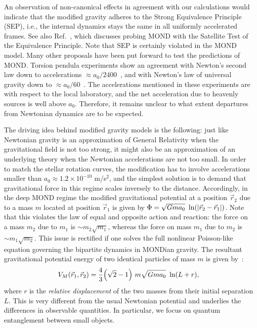 \documentclass[aps,prd,reprint,superscriptaddress,nofootinbib,floatfix]{revtex4-2}
\begin{document}
An observation of non-canonical effects in agreement with our calculations would indicate that the modified gravity adheres to the Strong Equivalence Principle (SEP), i.e., the internal dynamics stays the same in all uniformly accelerated frames.
See also Ref.~\cite{MOND-SEPwSTEP-Pereira2016}, which discusses probing MOND with the Satellite Test of the Equivalence Principle. Note that SEP is certainly violated in the MOND model.
Many other proposals have been put forward to test the predictions of MOND. Torsion pendula experiments show an agreement with Newton's second law down to accelerations $\approx a_0/2400$~\cite{NewtonLaw-TorsionPend-Gundlach2007}, and with Newton's law of universal gravity down to $\approx a_0/60$~\cite{TestNewton-Little2014}.
The accelerations mentioned in these experiments are with respect to the local laboratory, and the net acceleration due to heavenly sources is well above $a_0$. Therefore, it remains unclear to what extent departures from Newtonian dynamics are to be expected.


The driving idea behind modified gravity models is the following: just like Newtonian gravity is an approximation of General Relativity when the gravitational field is not too strong, it might also be an approximation of an underlying theory when the Newtonian accelerations are not too small.
In order to match the stellar rotation curves, the modification has to involve accelerations smaller than $a_0 \approx 1.2 \times 10^{-10}$ m/s$^2$, and the simplest solution is to demand that gravitational force in this regime scales inversely to the distance.
Accordingly, in the deep MOND regime the modified gravitational potential at a position $\vec r_2$ due to a mass $m$ located at position $\vec r_1$ is given by $\Phi = \sqrt{Gma_0} \ \ln( \abs{\vec r_2 - \vec r_1})$. 
Note that this violates the law of equal and opposite action and reaction: the force on a mass $m_2$ due to $m_1$ is $\sim m_2\sqrt{m_1}$, whereas the force on mass $m_1$ due to $m_2$ is $\sim m_1\sqrt{m_2}$.
This issue is rectified if one solves the full nonlinear Poisson-like equation governing the bipartite dynamics in MONDian gravity.
The resultant gravitational potential energy of two identical particles of mass $m$ is given by~\cite{MOND2Body-Milgrom2014,MOND2Body-Zhao2010,MOND2Body-Milgrom1986}:
\begin{equation}
V_M(\vec r_1, \vec r_2) =  \frac{4}{3} \qty( \sqrt{2} - 1 ) \ m \sqrt{G m a_0} \ \ln(L+r) ,
\label{eq:ForceIdenticalMasses}    
\end{equation}
where $r$ %
is the \emph{relative displacement} of the two masses from their initial separation $L$.
This is very different from the usual Newtonian potential and underlies the differences in observable quantities.
In particular, we focus on quantum entanglement between small objects.
\end{document}
